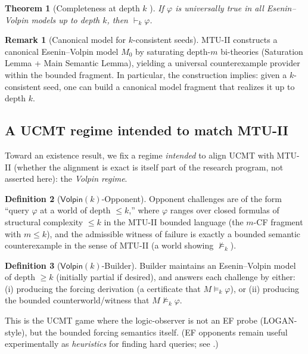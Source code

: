\documentclass[11pt]{article}
\theoremstyle{definition}
\newtheorem{definition}{Definition}[section]
\newtheorem{remark}{Remark}[section]
\theoremstyle{plain}
\newtheorem{theorem}[definition]{Theorem}
\begin{document}
\begin{theorem}[Completeness at depth $k$ {\cite{Mannucci2023MTU2}}]
\label{thm:mtu-completeness}
If $\varphi$ is universally true in all Esenin--Volpin models up to depth $k$,
then $\vdash_k \varphi$.
\end{theorem}

\begin{remark}[Canonical model for $k$-consistent seeds]
MTU-II constructs a canonical Esenin--Volpin model $M_0$ by saturating depth-$m$ bi-theories
(Saturation Lemma + Main Semantic Lemma), yielding a universal counterexample provider
within the bounded fragment. In particular, the construction implies: given a $k$-consistent
seed, one can build a canonical model fragment that realizes it up to depth $k$.
\end{remark}

\subsection{A UCMT regime intended to match MTU-II}

Toward an existence result, we fix a regime \emph{intended} to align UCMT with MTU-II (whether the
alignment is exact is itself part of the research program, not asserted here): the \emph{Volpin regime}.

\begin{definition}[$\mathsf{Volpin}(k)$-Opponent]
\label{def:volpin-opponent}
Opponent challenges are of the form ``query $\varphi$ at a world of depth $\le k$,'' where
$\varphi$ ranges over closed formulas of structural complexity $\le k$ in the MTU-II bounded language
(the $m$-CF fragment with $m\le k$), and the admissible witness of failure is exactly a bounded
semantic counterexample in the sense of MTU-II (a world showing $\not\models_k$).
\end{definition}

\begin{definition}[$\mathsf{Volpin}(k)$-Builder]
\label{def:volpin-builder}
Builder maintains an Esenin--Volpin model of depth $\ge k$ (initially partial if desired),
and answers each challenge by either:
(i) producing the forcing derivation (a certificate that $M \models_k \varphi$), or
(ii) producing the bounded counterworld/witness that $M \not\models_k \varphi$.
\end{definition}

This is the UCMT game where the logic-observer is not an EF probe (LOGAN-style), but the
bounded forcing semantics itself. (EF opponents remain useful experimentally as \emph{heuristics}
for finding hard queries; see .)
\end{document}

